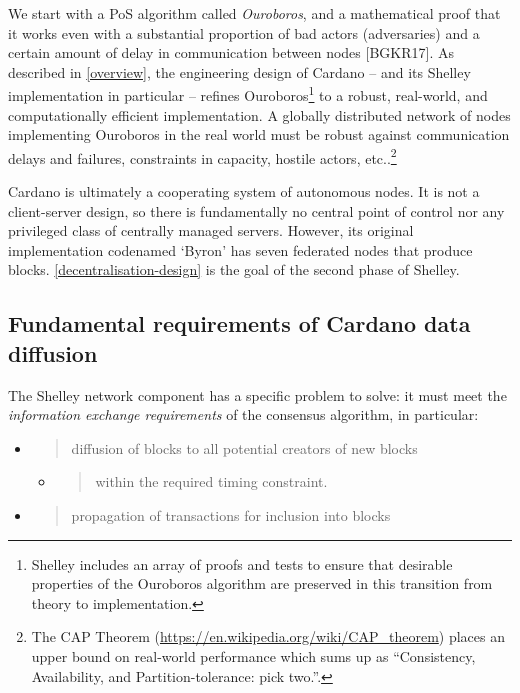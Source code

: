 \documentclass[11pt,a4paper]{article}
\begin{document}
We start with a PoS algorithm called \emph{Ouroboros}, and a
mathematical proof that it works even with a substantial proportion of
bad actors (adversaries) and a certain amount of delay in communication
between nodes {[}BGKR17{]}. As described in
\cref{overview}, the engineering design of
Cardano -- and its Shelley implementation in particular -- refines
Ouroboros\footnote{Shelley includes an array of proofs and tests to
  ensure that desirable properties of the Ouroboros algorithm are
  preserved in this transition from theory to implementation.} to a
robust, real-world, and computationally efficient implementation. A
globally distributed network of nodes implementing Ouroboros in the real
world must be robust against communication delays and failures,
constraints in capacity, hostile actors, etc..\footnote{The CAP Theorem
  (\href{https://en.wikipedia.org/wiki/CAP_theorem}{{https://en.wikipedia.org/wiki/CAP\_theorem}})
  places an upper bound on real-world performance which sums up as
  ``Consistency, Availability, and Partition-tolerance: pick two.''.}

Cardano is ultimately a cooperating system of autonomous nodes. It is
not a client-server design, so there is fundamentally no central point
of control nor any privileged class of centrally managed servers.
However, its original implementation codenamed `Byron' has seven
federated nodes that produce blocks.
\cref{decentralisation-design} is
the goal of the second phase of Shelley.

\subsection{Fundamental requirements of Cardano data diffusion}
\label{fundamental-requirements-of-cardano-data-diffusion}

The Shelley network component has a specific problem to solve: it must
meet the \emph{information exchange requirements} of the consensus
algorithm, in particular:

\begin{itemize}
\item
  \begin{quote}
  diffusion of blocks to all potential creators of new blocks
  \end{quote}

  \begin{itemize}
  \item
    \begin{quote}
    within the required timing constraint.
    \end{quote}
  \end{itemize}
\item
  \begin{quote}
  propagation of transactions for inclusion into blocks
  \end{quote}
\end{itemize}
\end{document}

